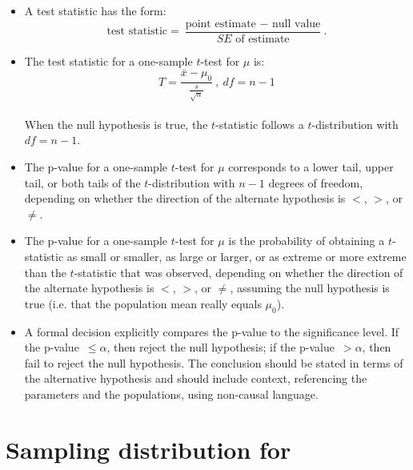 \begin{itemize}
\item A test statistic has the form: \\
$$\text{test statistic} = \frac{\text{point estimate } - \text{ null value}}{SE \text{ of estimate}} .$$  

\item 
The test statistic for a one-sample $t$-test for $\mu$ is: \\
$$T = \frac{\bar{x} - \mu_0}{\frac{s}{\sqrt{n}}}\ ,\ df = n-1$$ \\
When the null hypothesis is true, the $t$-statistic follows a $t$-distribution with $df = n-1$.  

\item The p-value for a one-sample $t$-test for $\mu$ corresponds to a lower tail, upper tail, or both tails of the $t$-distribution with $n-1$ degrees of freedom, depending on whether the direction of the alternate hypothesis is $<$, $>$, or $\ne$.

\item The p-value for a one-sample $t$-test for $\mu$ is the probability of obtaining a $t$-statistic as small or smaller, as large or larger, or as extreme or more extreme than the $t$-statistic that was observed, depending on whether the direction of the alternate hypothesis is $<$, $>$, or $\ne$, assuming the null hypothesis is true (i.e. that the population mean really equals $\mu_0$).  

\item A formal decision explicitly compares the p-value to the significance level.  If the \mbox{p-value $\le \alpha$,} then reject the null hypothesis; if the \mbox{p-value $> \alpha$,} then fail to reject the null hypothesis.   The conclusion should be stated in terms of the alternative hypothesis and should include context, referencing the parameters and the populations, using non-causal language.

\end{itemize}



{}




\section[Sampling distribution for a difference in sample means]{Sampling distribution for }
\label{distributionofdifferenceofmeans}


